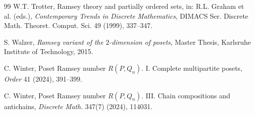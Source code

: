 \documentclass[twoside,12pt]{article}
\begin{document}
\begin{thebibliography}{99}
W.T. Trotter, Ramsey theory and partially ordered sets, in: R.L. Graham et al. (eds.), \emph{Contemporary Trends in Discrete Mathematics}, DIMACS Ser. Discrete Math. Theoret. Comput. Sci. 49 (1999), 337--347.

S. Walzer, \emph{Ramsey variant of the $2$-dimension of posets}, Master Thesis, Karlsruhe Institute of Technology, 2015.

C. Winter, Poset Ramsey number $R(P,Q_n)$. I. Complete multipartite posets, \emph{Order} 41 (2024), 391--399.



C. Winter, Poset Ramsey number $R(P,Q_n)$. III. Chain compositions and antichains, \emph{Discrete Math.} 347(7) (2024), 114031.

\end{thebibliography}
\end{document}
